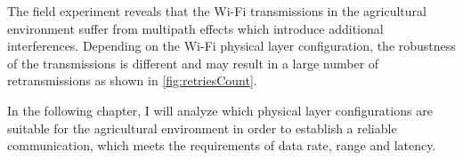 
The field experiment reveals that the Wi-Fi transmissions in the agricultural environment suffer from multipath effects which introduce
additional interferences.
Depending on the Wi-Fi physical layer configuration, the robustness of the transmissions is different and may result in a large number of retransmissions
as shown in \autoref{fig:retriesCount}.

In the following chapter, I will analyze which physical layer
configurations are suitable for the agricultural environment in order to establish a reliable communication,
which meets the requirements of data rate, range and latency.

